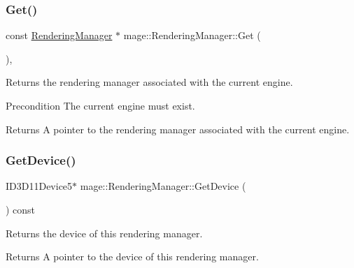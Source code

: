 \subsubsection{\texorpdfstring{Get()}{Get()}}
{\footnotesize\ttfamily const \hyperlink{classmage_1_1_rendering_manager}{Rendering\+Manager} $\ast$ mage\+::\+Rendering\+Manager\+::\+Get (\begin{DoxyParamCaption}{ }\end{DoxyParamCaption})\hspace{0.3cm}{\ttfamily [static]}, {\ttfamily [noexcept]}}

Returns the rendering manager associated with the current engine.

\begin{DoxyPrecond}{Precondition}
The current engine must exist. 
\end{DoxyPrecond}
\begin{DoxyReturn}{Returns}
A pointer to the rendering manager associated with the current engine. 
\end{DoxyReturn}
\hypertarget{classmage_1_1_rendering_manager_a92dc62ffd2e86652edd86739ff878ac2}{}\label{classmage_1_1_rendering_manager_a92dc62ffd2e86652edd86739ff878ac2} 
\subsubsection{\texorpdfstring{Get\+Device()}{GetDevice()}}
{\footnotesize\ttfamily I\+D3\+D11\+Device5$\ast$ mage\+::\+Rendering\+Manager\+::\+Get\+Device (\begin{DoxyParamCaption}{ }\end{DoxyParamCaption}) const\hspace{0.3cm}{\ttfamily [noexcept]}}

Returns the device of this rendering manager.

\begin{DoxyReturn}{Returns}
A pointer to the device of this rendering manager. 
\end{DoxyReturn}
\hypertarget{classmage_1_1_rendering_manager_a8067ea5d29a3f986dfdbd90ed1b956ee}{}\label{classmage_1_1_rendering_manager_a8067ea5d29a3f986dfdbd90ed1b956ee} 
